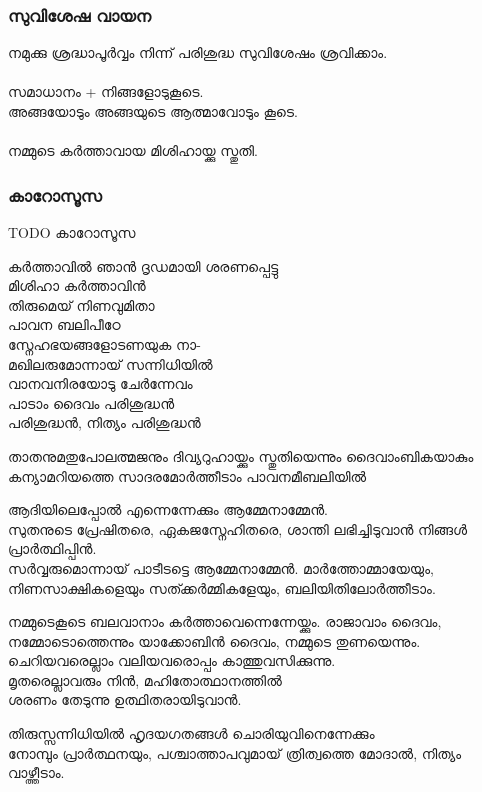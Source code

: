 \documentclass[20pt]{beamer}
\newcommand{\Priest}[1]{\color{white}#1}
\newcommand{\People}[1]{\color{yellow}#1}
\newcommand{\Server}[1]{\color{lightgray}#1}
\newcommand{\PPeace}{\Priest{സമാധാനം + നിങ്ങളോടുകൂടെ.}}
\begin{document}
\begin{frame}
\frametitle{സുവിശേഷ വായന}
\Server{നമുക്കു ശ്രദ്ധാപൂര്‍വ്വം നിന്ന് പരിശുദ്ധ സുവിശേഷം ശ്രവിക്കാം.}\\~\\
\PPeace\\
\People{അങ്ങയോടും അങ്ങയുടെ ആത്മാവോടും കൂടെ.}\\~\\
\People{നമ്മുടെ കര്‍ത്താവായ മിശിഹായ്ക്കു സ്തുതി.}
\end{frame}

\begin{frame}
\frametitle{കാറോസൂസ}
TODO കാറോസൂസ
\end{frame}

\begin{frame}
\Server{കര്‍ത്താവില്‍ ഞാന്‍ ദൃഡമായി ശരണപ്പെട്ടു}\\
\People{
മിശിഹാ കര്‍ത്താവിന്‍\\
തിരുമെയ്‌ നിണവുമിതാ\\
പാവന ബലിപീഠേ\\
സ്നേഹഭയങ്ങളോടണയുക നാ-\\
മഖിലരുമോന്നായ് സന്നിധിയില്‍\\
വാനവനിരയോടു ചേര്‍ന്നേവം \\
പാടാം ദൈവം പരിശുദ്ധന്‍\\
പരിശുദ്ധന്‍, നിത്യം പരിശുദ്ധന്‍}
\end{frame}

\begin{frame}[allowframebreaks]
\Priest{
താതനുമതുപോലത്മജനും ദിവ്യറുഹായ്ക്കും സ്തുതിയെന്നും
ദൈവാംബികയാകും കന്യാമറിയത്തെ 
സാദരമോർത്തീടാം പാവനമീബലിയില്‍}\par
\People{
ആദിയിലെപ്പോല്‍ എന്നെന്നേക്കും
ആമ്മേനാമ്മേന്‍.\\
സുതനുടെ പ്രേഷിതരെ, ഏകജസ്നേഹിതരെ,
ശാന്തി ലഭിച്ചിടുവാന്‍ നിങ്ങള്‍ പ്രാര്‍ത്ഥിപ്പിന്‍.}\\
\framebreak
\Priest{
സര്‍വ്വരുമൊന്നായ്‌ പാടീടട്ടെ 
ആമ്മേനാമ്മേന്‍.
മാർത്തോമ്മായേയും, നിണസാക്ഷികളെയും 
സത്ക്കർമ്മികളേയും, ബലിയിതിലോര്‍ത്തീടാം.}\par
\People{
നമ്മുടെകൂടെ ബലവാനാം
കര്‍ത്താവെന്നെന്നേയ്ക്കും.
രാജാവാം ദൈവം, നമ്മോടൊത്തെന്നും 
യാക്കോബിന്‍ ദൈവം, നമ്മുടെ തുണയെന്നും.}\\
\framebreak
\Priest{
ചെറിയവരെല്ലാം വലിയവരൊപ്പം
കാത്തുവസിക്കുന്നു.\\
മൃതരെല്ലാവരും നിൻ, മഹിതോത്ഥാനത്തിൽ\\
ശരണം തേടുന്നു ഉത്ഥിതരായിടുവാന്‍.}\par
\People{
തിരുസ്സന്നിധിയില്‍  ഹൃദയഗതങ്ങള്‍
ചൊരിയുവിനെന്നേക്കും\\
നോമ്പും പ്രാര്‍ത്ഥനയും, പശ്ചാത്താപവുമായ്
ത്രിത്വത്തെ മോദാല്‍, നിത്യം വാഴ്ത്തീടാം.}\\
\end{frame}
\end{document}
